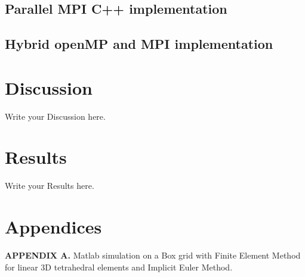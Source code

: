 \documentclass[12pt]{article}
\begin{document}
\subsection{Parallel MPI C++ implementation}

\subsection{Hybrid openMP and MPI implementation}


	
	\section{Discussion}
	Write your Discussion here.	
	
	\section{Results}
	Write your Results here.
	
	
	\section{Appendices}
	
	\textbf{APPENDIX A.} Matlab simulation on a Box grid with Finite Element Method for linear 3D tetrahedral elements and Implicit Euler Method.
	
\end{document}
